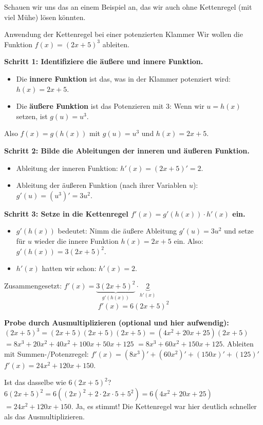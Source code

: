 Schauen wir uns das an einem Beispiel an, das wir auch ohne Kettenregel (mit viel Mühe) lösen könnten.

\begin{beispielumgebung}{Anwendung der Kettenregel bei einer potenzierten Klammer}
Wir wollen die Funktion $f(x) = (2x+5)^3$ ableiten.

\textbf{Schritt 1: Identifiziere die äußere und innere Funktion.}
\begin{itemize}
    \item Die \textbf{innere Funktion} ist das, was in der Klammer potenziert wird: $h(x) = 2x+5$.
    \item Die \textbf{äußere Funktion} ist das Potenzieren mit 3: Wenn wir $u = h(x)$ setzen, ist $g(u) = u^3$.
\end{itemize}
Also $f(x) = g(h(x))$ mit $g(u)=u^3$ und $h(x)=2x+5$.

\textbf{Schritt 2: Bilde die Ableitungen der inneren und äußeren Funktion.}
\begin{itemize}
    \item Ableitung der inneren Funktion: $h'(x) = (2x+5)' = 2$.
    \item Ableitung der äußeren Funktion (nach ihrer Variablen $u$): $g'(u) = (u^3)' = 3u^2$.
\end{itemize}

\textbf{Schritt 3: Setze in die Kettenregel $f'(x) = g'(h(x)) \cdot h'(x)$ ein.}
\begin{itemize}
    \item $g'(h(x))$ bedeutet: Nimm die äußere Ableitung $g'(u)=3u^2$ und setze für $u$ wieder die innere Funktion $h(x)=2x+5$ ein.
    Also: $g'(h(x)) = 3(2x+5)^2$.
    \item $h'(x)$ hatten wir schon: $h'(x) = 2$.
\end{itemize}
Zusammengesetzt:
$f'(x) = \underbrace{3(2x+5)^2}_{g'(h(x))} \cdot \underbrace{2}_{h'(x)}$
\[ f'(x) = 6(2x+5)^2 \]

\textbf{Probe durch Ausmultiplizieren (optional und hier aufwendig):}
$(2x+5)^3 = (2x+5)(2x+5)(2x+5) = (4x^2+20x+25)(2x+5)$
$= 8x^3 + 20x^2 + 40x^2 + 100x + 50x + 125$
$= 8x^3 + 60x^2 + 150x + 125$.
Ableiten mit Summen-/Potenzregel:
$f'(x) = (8x^3)' + (60x^2)' + (150x)' + (125)'$
$f'(x) = 24x^2 + 120x + 150$.

Ist das dasselbe wie $6(2x+5)^2$?
$6(2x+5)^2 = 6((2x)^2 + 2 \cdot 2x \cdot 5 + 5^2) = 6(4x^2 + 20x + 25)$
$= 24x^2 + 120x + 150$. Ja, es stimmt!
Die Kettenregel war hier deutlich schneller als das Ausmultiplizieren.
\end{beispielumgebung}

